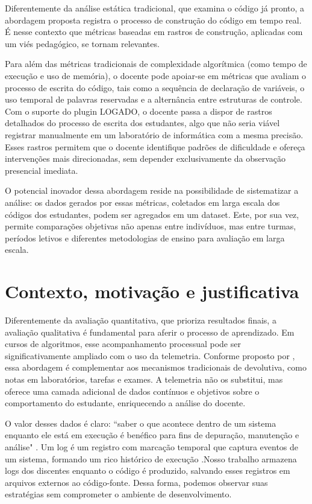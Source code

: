 Diferentemente da análise estática tradicional, que examina o código já pronto, a abordagem proposta registra o processo de construção do código em tempo real. É nesse contexto que métricas baseadas em rastros de construção, aplicadas com um viés pedagógico, se tornam relevantes.

Para além das métricas tradicionais de complexidade algorítmica (como tempo de execução e uso de memória), o docente pode apoiar-se em métricas que avaliam o processo de escrita do código, tais como a sequência de declaração de variáveis, o uso temporal de palavras reservadas e a alternância entre estruturas de controle. Com o suporte do plugin LOGADO, o docente passa a dispor de rastros detalhados do processo de escrita dos estudantes, algo que não seria viável registrar manualmente em um laboratório de informática com a mesma precisão. Esses rastros permitem que o docente identifique padrões de dificuldade e ofereça intervenções mais direcionadas, sem depender exclusivamente da observação presencial imediata.

O potencial inovador dessa abordagem reside na possibilidade de sistematizar a análise: os dados gerados por essas métricas, coletados em larga escala dos códigos dos estudantes, podem ser agregados em um dataset. Este, por sua vez, permite comparações objetivas não apenas entre indivíduos, mas entre turmas, períodos letivos e diferentes metodologias de ensino para avaliação em larga escala.
\section{Contexto, motivação e justificativa}\label{sec:consideracoesIniciais}

Diferentemente da avaliação quantitativa, que prioriza resultados finais, a avaliação qualitativa é fundamental para aferir o processo de aprendizado. Em cursos de algoritmos, esse acompanhamento processual pode ser significativamente ampliado com o uso da telemetria. Conforme proposto por \cite{kennedy2015towards}, essa abordagem é complementar aos mecanismos tradicionais de devolutiva, como notas em laboratórios, tarefas e exames. A telemetria não os substitui, mas oferece uma camada adicional de dados contínuos e objetivos sobre o comportamento do estudante, enriquecendo a análise do docente.

O valor desses dados é claro: ``saber o que acontece dentro de um sistema enquanto ele está em execução é benéfico para fins de depuração, manutenção e análise" \cite{Gatev2021}. Um log é um registro com marcação temporal que captura eventos de um sistema, formando um rico histórico de execução \cite{gu2022logging}.Nosso trabalho armazena logs dos discentes enquanto o código é produzido, salvando esses registros em arquivos externos ao código-fonte. Dessa forma, podemos observar suas estratégias sem comprometer o ambiente de desenvolvimento.


